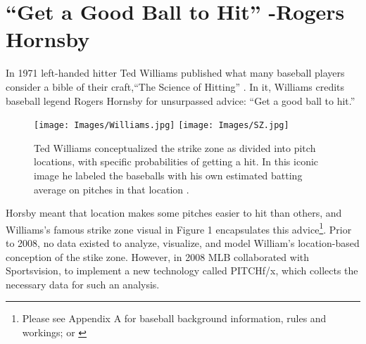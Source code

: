 \section{``Get a Good Ball to Hit'' -Rogers Hornsby}
In 1971 left-handed hitter Ted Williams published what many baseball players consider a bible of their craft,``The Science of Hitting'' \citep{Williams1971}. In it, Williams credits baseball legend Rogers Hornsby for unsurpassed advice: ``Get a good ball to hit.''
        \begin{figure}[H]
      	\centering
      	\texttt{[image: Images/Williams.jpg]} 
      	\texttt{[image: Images/SZ.jpg]}
      	\caption{Ted Williams conceptualized the strike zone as divided into pitch locations, with specific probabilities of getting a hit. In this iconic image he labeled the baseballs with his own estimated batting average on pitches in that location \citep{Williams1971}.}
      	\end{figure} 
Horsby meant that location makes some pitches easier to hit than others, and  Williams's famous strike zone visual in Figure 1 encapsulates this advice\footnote{Please see Appendix A for baseball background information, rules and workings; or \citep{Wiki}}. Prior to 2008, no data existed to analyze, visualize, and model William's location-based conception of the stike zone. However, in 2008 MLB collaborated with Sportsvision, to implement a new technology called PITCHf/x\textsuperscript{\textregistered}, which collects the necessary data for such an analysis.

